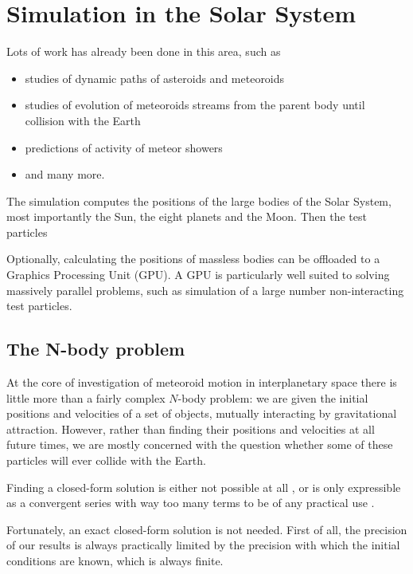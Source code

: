 \section{Simulation in the Solar System} \label{ms}
    Lots of work has already been done in this area, such as
    \begin{itemize}
        \item studies of dynamic paths of asteroids and meteoroids
        \item studies of evolution of meteoroids streams from the parent body until collision with the Earth
        \item predictions of activity of meteor showers
        \item and many more.
    \end{itemize}

    The simulation computes the positions of the large bodies of the Solar System, most importantly the Sun,
    the eight planets and the Moon. Then the test particles

    Optionally, calculating the positions of massless bodies can be offloaded to a Graphics Processing Unit (GPU).
    A GPU is particularly well suited to solving massively parallel problems,
    such as simulation of a large number non-interacting test particles.

    \subsection{The N-body problem} \label{msN}
        At the core of investigation of meteoroid motion in interplanetary space
        there is little more than a fairly complex $N$-body problem:
        we are given the initial positions and velocities of a set of objects,
        mutually interacting by gravitational attraction.
        However, rather than finding their positions and velocities at all future times, we are mostly concerned
        with the question whether some of these particles will ever collide with the Earth.

        Finding a closed-form solution is either not possible at all \cite{...}, or is only expressible
        as a convergent series with way too many terms to be of any practical use \citep{beloriszky-1930}.

        Fortunately, an exact closed-form solution is not needed. First of all, the precision of our results
        is always practically limited by the precision with which the initial conditions are known,
        which is always finite.

